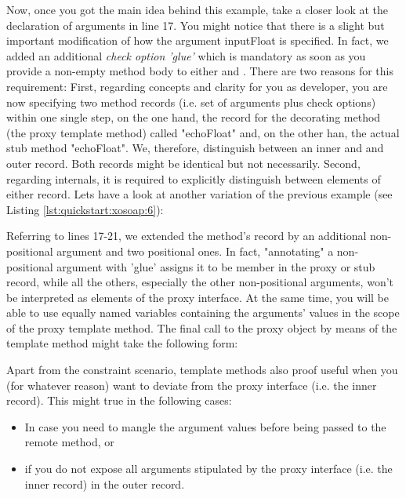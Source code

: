Now, once you got the main idea behind this example, take a closer look  at the declaration of 
arguments in line 17. You might notice that there is a slight but important modification of how the 
argument inputFloat is specified. In fact, we added an additional \emph{check option 'glue'} which is 
mandatory as soon as you provide a non-empty method body to either  and . There 
are two reasons for this requirement: First, regarding concepts and clarity for you as developer, you are 
now specifying two method records (i.e. set of arguments plus check options)  within one single step, on 
the one hand, the record for the decorating method (the proxy template method) called "echoFloat" and, 
on the other han, the actual stub method "echoFloat". We, therefore, distinguish between an inner and 
and outer record. Both records might be identical but not necessarily. Second, regarding internals, it is 
required to explicitly distinguish between elements of either record. Lets have a look at another variation 
of the previous example (see Listing \ref{lst:quickstart:xosoap:6}):



Referring to lines 17-21, we extended the method's record by an additional non-positional argument and 
two positional ones. In fact, "annotating" a non-positional argument with 'glue' assigns it to be member in 
the proxy or stub record, while all the others, especially the other non-positional arguments, won't be 
interpreted as elements of the proxy interface. At the same time, you will be able to use equally named 
variables containing the arguments' values in the scope of the proxy template method. The final call to 
the proxy object by means of the template method might take the following form:



Apart from the constraint scenario, template methods also proof useful when you (for whatever reason) 
want to deviate from the proxy interface (i.e. the inner record). This might true in the following cases:
\begin{itemize}
\item In case you need to mangle the argument values before being passed to the remote method, or
\item if you do not expose all arguments stipulated by the proxy interface (i.e. the inner record) in the 
outer record.
\end{itemize}

